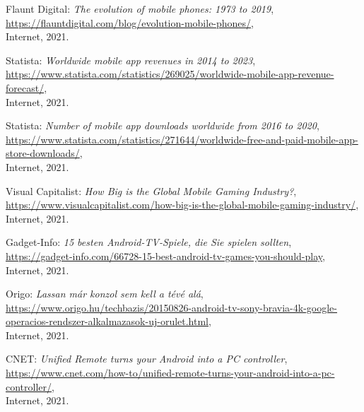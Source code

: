 \begin{thebibliography}{x}
	Flaunt Digital: \emph{The evolution of mobile phones: 1973 to 2019}, \\
	\url{https://flauntdigital.com/blog/evolution-mobile-phones/}, \\
	Internet, 2021.
	
	Statista: \emph{Worldwide mobile app revenues in 2014 to 2023}, \\
	\url{https://www.statista.com/statistics/269025/worldwide-mobile-app-revenue-forecast/}, \\
	Internet, 2021.
	
	Statista: \emph{Number of mobile app downloads worldwide from 2016 to 2020}, \\
	\url{https://www.statista.com/statistics/271644/worldwide-free-and-paid-mobile-app-store-downloads/}, \\
	Internet, 2021.
	
	Visual Capitalist: \emph{How Big is the Global Mobile Gaming Industry?}, \\
	\url{https://www.visualcapitalist.com/how-big-is-the-global-mobile-gaming-industry/}, \\
	Internet, 2021.
	
	Gadget-Info: \emph{15 besten Android-TV-Spiele, die Sie spielen sollten}, \\
	\url{https://gadget-info.com/66728-15-best-android-tv-games-you-should-play}, \\
	Internet, 2021.
	
	Origo: \emph{Lassan már konzol sem kell a tévé alá}, \\
	\url{https://www.origo.hu/techbazis/20150826-android-tv-sony-bravia-4k-google-operacios-rendszer-alkalmazasok-uj-orulet.html}, \\
	Internet, 2021.
	
	CNET: \emph{Unified Remote turns your Android into a PC controller}, \\
	\url{https://www.cnet.com/how-to/unified-remote-turns-your-android-into-a-pc-controller/}, \\
	Internet, 2021.
	

\end{thebibliography}
